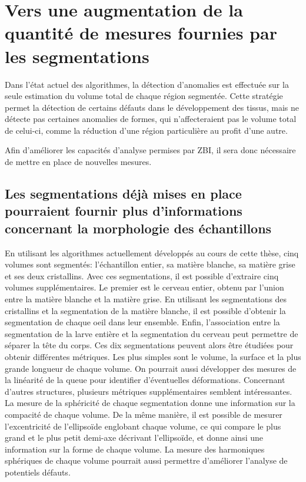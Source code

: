 \documentclass[\main/main.tex]{subfiles}
\begin{document}
                    
\section{Vers une augmentation de la quantité de mesures fournies par les segmentations}
%
Dans l'état actuel des algorithmes, la détection d'anomalies est effectuée sur la seule estimation du volume total de chaque région segmentée. Cette stratégie permet la détection de certains défauts dans le développement des tissus, mais ne détecte pas certaines anomalies de formes, qui n'affecteraient pas le volume total de celui-ci, comme la réduction d'une région particulière au profit d'une autre.

Afin d'améliorer les capacités d'analyse permises par ZBI, il sera donc nécessaire de mettre en place de nouvelles mesures.

    \subsection{Les segmentations déjà mises en place pourraient fournir plus d'informations concernant la morphologie des échantillons}

%
En utilisant les algorithmes actuellement développés au cours de cette thèse,
cinq volumes sont segmentés: l'échantillon entier, sa matière blanche, sa matière grise et ses deux cristallins. Avec ces segmentations, il est possible d'extraire cinq volumes supplémentaires.  Le premier est le cerveau entier, obtenu par l'union entre la matière blanche et la matière grise. 
%
En utilisant les segmentations des cristallins et la segmentation de la matière blanche, il est possible d'obtenir la segmentation de chaque oeil dans leur ensemble.
%
Enfin, l'association entre la segmentation de la larve entière et la segmentation du cerveau peut permettre de séparer la tête du corps.
%
Ces dix segmentations peuvent alors être étudiées pour obtenir différentes métriques. Les plus simples sont le volume, la surface et la plus grande longueur de chaque volume. On pourrait aussi développer des mesures de la linéarité de la queue pour identifier d'éventuelles déformations.
%
Concernant d'autres structures, plusieurs métriques supplémentaires semblent intéressantes.
%
La mesure de la sphéricité de chaque segmentation donne une information sur la compacité de chaque volume.
%
De la même manière, il est possible de mesurer l'excentricité de l'ellipsoïde englobant chaque volume, ce qui compare le plus grand et le plus petit demi-axe décrivant l'ellipsoïde, et donne ainsi une information sur la forme de chaque volume.
%
La mesure des harmoniques sphériques de chaque volume pourrait aussi permettre d'améliorer l'analyse de potentiels défauts.
\end{document}

